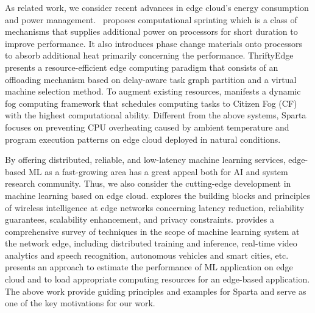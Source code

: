 As related work, we consider recent advances in edge cloud's energy consumption and power management.~\cite{ref:computational_sprint} proposes computational sprinting which is a class of mechanisms that supplies additional power on processors for short duration to improve performance. It also introduces phase change materials onto processors to absorb additional heat primarily concerning the performance. ThriftyEdge~\cite{ref:thrifty_edge} presents a resource-efficient edge computing paradigm that consists of an offloading mechanism based on delay-aware task graph partition and a virtual machine selection method. To augment existing resources, \cite{ref:fog} manifests a dynamic fog computing framework that schedules computing tasks to Citizen Fog (CF) with the highest computational ability. Different from the above systems, Sparta focuses on preventing CPU overheating caused by ambient temperature and program execution patterns on edge cloud deployed in natural conditions. 

By offering distributed, reliable, and low-latency machine learning services, edge-based ML as a fast-growing area has a great appeal both for AI and system research community. Thus, we also consider the cutting-edge development in machine learning based on edge cloud. \cite{ref:wireless} explores the building blocks and principles of wireless intelligence at edge networks concerning latency reduction, reliability guarantees, scalability enhancement, and privacy constraints. \cite{ref:survey} provides a comprehensive survey of techniques in the scope of machine learning system at the network edge, including distributed training and inference, real-time video analytics and speech recognition, autonomous vehicles and smart cities, etc. \cite{ref:stargazer} presents an approach to estimate the performance of ML application on edge cloud and to load appropriate computing resources for an edge-based application. The above work provide guiding principles and examples for Sparta and serve as one of the key motivations for our work.